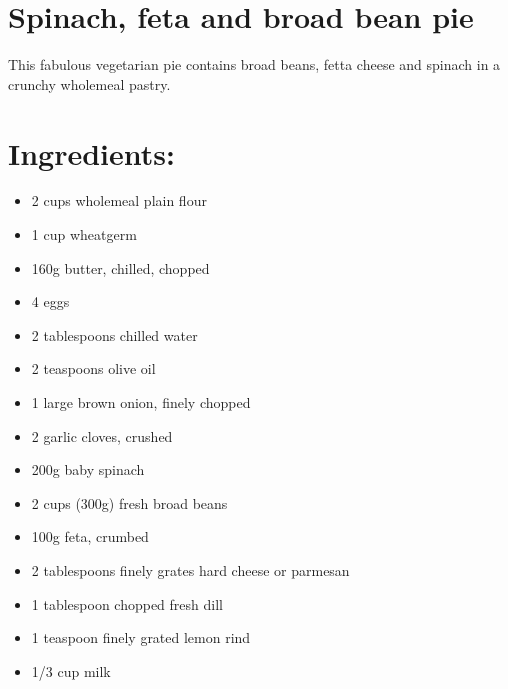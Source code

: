 \section{Spinach, feta and broad bean pie}
This fabulous vegetarian pie contains broad beans, fetta cheese and spinach in a crunchy wholemeal pastry.
\section{Ingredients:}
\begin{itemize}
	\item 2 cups wholemeal plain flour
	\item 1 cup wheatgerm
	\item 160g butter, chilled, chopped
	\item 4 eggs
	\item 2 tablespoons chilled water
	\item 2 teaspoons olive oil
	\item 1 large brown onion, finely chopped
	\item 2 garlic cloves, crushed
	\item 200g baby spinach
	\item 2 cups (300g) fresh broad beans
	\item 100g feta, crumbed
	\item 2 tablespoons finely grates hard cheese or parmesan
	\item 1 tablespoon chopped fresh dill
	\item 1 teaspoon finely grated lemon rind
	\item 1/3 cup milk
\end{itemize}

